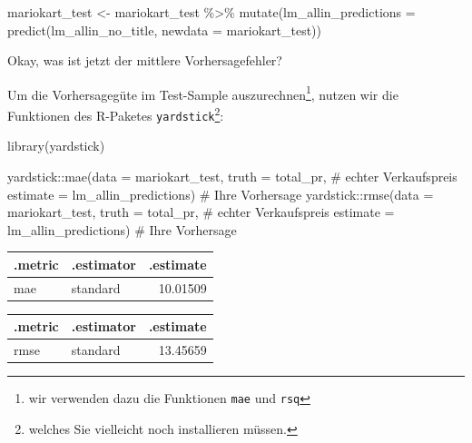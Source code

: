 \documentclass[
  a4paper,
]{scrbook}
\newenvironment{Shaded}{\begin{snugshade}}{\end{snugshade}}
\newcommand{\AttributeTok}[1]{\textcolor[rgb]{0.40,0.45,0.13}{#1}}
\newcommand{\CommentTok}[1]{\textcolor[rgb]{0.37,0.37,0.37}{#1}}
\newcommand{\FunctionTok}[1]{\textcolor[rgb]{0.28,0.35,0.67}{#1}}
\newcommand{\NormalTok}[1]{\textcolor[rgb]{0.00,0.23,0.31}{#1}}
\newcommand{\OtherTok}[1]{\textcolor[rgb]{0.00,0.23,0.31}{#1}}
\newcommand{\SpecialCharTok}[1]{\textcolor[rgb]{0.37,0.37,0.37}{#1}}
\theoremstyle{definition}
\theoremstyle{definition}
\theoremstyle{definition}
\theoremstyle{remark}
\begin{document}
\begin{Shaded}
\begin{Highlighting}[]
\NormalTok{mariokart\_test }\OtherTok{\textless{}{-}}
\NormalTok{  mariokart\_test }\SpecialCharTok{\%\textgreater{}\%} 
  \FunctionTok{mutate}\NormalTok{(}\AttributeTok{lm\_allin\_predictions =} \FunctionTok{predict}\NormalTok{(lm\_allin\_no\_title, }\AttributeTok{newdata =}\NormalTok{ mariokart\_test))}
\end{Highlighting}
\end{Shaded}

Okay, was ist jetzt der mittlere Vorhersagefehler?

Um die Vorhersagegüte im Test-Sample auszurechnen\footnote{wir verwenden
  dazu die Funktionen \texttt{mae} und \texttt{rsq}}, nutzen wir die
Funktionen des R-Paketes \texttt{yardstick}\footnote{welches Sie
  vielleicht noch installieren müssen.}:

\begin{Shaded}
\begin{Highlighting}[]
\FunctionTok{library}\NormalTok{(yardstick)}

\NormalTok{yardstick}\SpecialCharTok{::}\FunctionTok{mae}\NormalTok{(}\AttributeTok{data =}\NormalTok{ mariokart\_test,}
               \AttributeTok{truth =}\NormalTok{ total\_pr,  }\CommentTok{\# echter Verkaufspreis}
               \AttributeTok{estimate =}\NormalTok{ lm\_allin\_predictions)  }\CommentTok{\# Ihre Vorhersage}
\NormalTok{yardstick}\SpecialCharTok{::}\FunctionTok{rmse}\NormalTok{(}\AttributeTok{data =}\NormalTok{ mariokart\_test,}
               \AttributeTok{truth =}\NormalTok{ total\_pr,  }\CommentTok{\# echter Verkaufspreis}
               \AttributeTok{estimate =}\NormalTok{ lm\_allin\_predictions)  }\CommentTok{\# Ihre Vorhersage}
\end{Highlighting}
\end{Shaded}

\begin{longtable}[]{@{}llr@{}}
\toprule\noalign{}
.metric & .estimator & .estimate \\
\midrule\noalign{}
\endhead
\bottomrule\noalign{}
\endlastfoot
mae & standard & 10.01509 \\
\end{longtable}

\begin{longtable}[]{@{}llr@{}}
\toprule\noalign{}
.metric & .estimator & .estimate \\
\midrule\noalign{}
\endhead
\bottomrule\noalign{}
\endlastfoot
rmse & standard & 13.45659 \\
\end{longtable}
\end{document}
